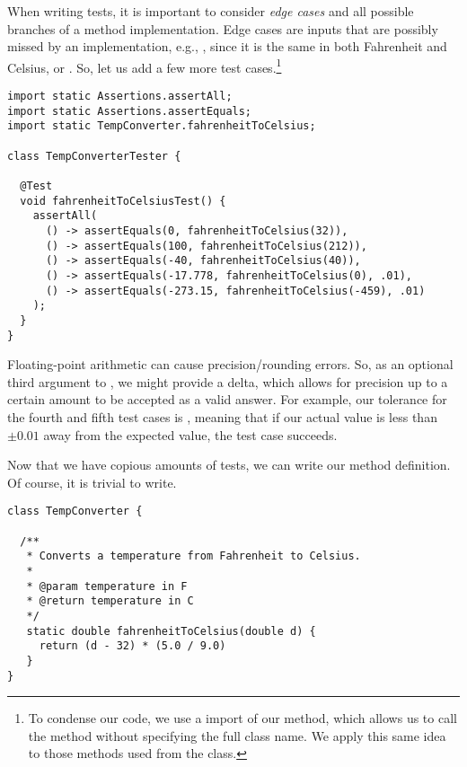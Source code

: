 When writing tests, it is important to consider \textit{edge cases} and all possible branches of a method implementation. Edge cases are inputs that are possibly missed by an implementation, e.g., , since it is the same in both Fahrenheit and Celsius, or . So, let us add a few more test cases.\footnote{To condense our code, we use a  import of our  method, which allows us to call the method without specifying the full class name. We apply this same idea to those methods used from the  class.}

\begin{cl}{}
\begin{lstlisting}[language=MyJava]
import static Assertions.assertAll;
import static Assertions.assertEquals;
import static TempConverter.fahrenheitToCelsius;

class TempConverterTester {

  @Test
  void fahrenheitToCelsiusTest() {
    assertAll(
      () -> assertEquals(0, fahrenheitToCelsius(32)),
      () -> assertEquals(100, fahrenheitToCelsius(212)),
      () -> assertEquals(-40, fahrenheitToCelsius(40)),
      () -> assertEquals(-17.778, fahrenheitToCelsius(0), .01),
      () -> assertEquals(-273.15, fahrenheitToCelsius(-459), .01)
    );
  }
}
\end{lstlisting}
\end{cl}

Floating-point arithmetic can cause precision/rounding errors. So, as an optional third argument to , we might provide a delta, which allows for precision up to a certain amount to be accepted as a valid answer. For example, our tolerance for the fourth and fifth test cases is , meaning that if our actual value is less than $\pm 0.01$ away from the expected value, the test case succeeds.

Now that we have copious amounts of tests, we can write our method definition. Of course, it is trivial to write.

\begin{cl}{}
\begin{lstlisting}[language=MyJava]
class TempConverter {

  /**
   * Converts a temperature from Fahrenheit to Celsius.
   * 
   * @param temperature in F
   * @return temperature in C
   */
   static double fahrenheitToCelsius(double d) {
     return (d - 32) * (5.0 / 9.0)
   }
}
\end{lstlisting}
\end{cl}

